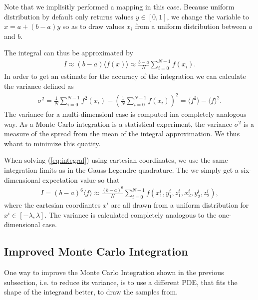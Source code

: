\documentclass[10pt, twocolumn]{aastex62}
\begin{document}
Note that we implisitly performed a mapping in this case. Because uniform
distribution by default only returns values $y\in[0, 1]$, we change the variable
to $x = a + (b-a)y$ so as to draw values $x_i$ from a uniform distribution
between $a$ and $b$. 

The integral can thus be approximated by 
\begin{align}
	I \approx (b-a)\langle f(x) \rangle \approx \frac{b-a}{N}\sum^{N-1}_{i=0}f(x_i).
\end{align}
In order to get an estimate for the accuracy of the integration we can calculate
the variance defined as 
\begin{align}
	\sigma^2 = \frac{1}{N}\sum_{i=0}^{N-1} f^2(x_i) - \left(\frac{1}{N}\sum_{i=0}^{N-1}f(x_i)\right)^2 = \langle f^2\rangle - \langle f\rangle^2.
\end{align}
The variance for a multi-dimensionl case is computed ina completely analogous way.
As a Monte Carlo integration is a statistical experiment, the variance
$\sigma^2$ is a measure of the spread from the mean of the integral
approximation. We thus whant to minimize this quatity.

When solving (\ref{eq:integral}) using cartesian coordinates, we use the same
integration limits as in the Gauss-Legendre quadrature. The we simply get a
six-dimensional expectation value so that 
\begin{align}
	I = (b-a)^6\langle f \rangle \approx \frac{(b-a)^6}{N}\sum^{N-1}_{i=0} f(x_1^i, y_1^i, z_1^i, x_2^i, y_2^i, z_2^i),
\end{align}
where the cartesian coordiantes $x^i$ are all drawn from a uniform distribution
for $x^i\in[-\lambda, \lambda]$. The variance is calculated completely analogous
to the one-dimensional case. 

\subsection{Improved Monte Carlo Integration}\label{subsec:improved_monte_carlo}
One way to improve the Monte Carlo Integration shown in the previous subsection,
i.e. to reduce its variance, is to use a different PDE, that fits the shape of
the integrand better, to draw the samples from.
\end{document}
